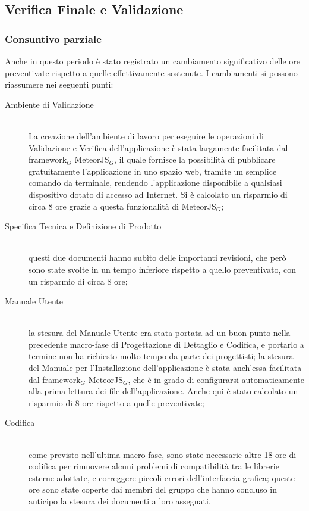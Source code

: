 \subsection{Verifica Finale e Validazione}

\subsubsection{Consuntivo parziale}
Anche in questo periodo è stato registrato un cambiamento significativo delle ore preventivate rispetto a quelle effettivamente sostenute. I cambiamenti si possono riassumere nei seguenti punti:
\begin{description}
\item[Ambiente di Validazione] \hfill \\
La creazione dell'ambiente di lavoro per eseguire le operazioni di Validazione e Verifica dell'applicazione è stata largamente facilitata dal framework$_G$ MeteorJS$_G$, il quale fornisce la possibilità di pubblicare gratuitamente l'applicazione in uno spazio web, tramite un semplice comando da terminale, rendendo l'applicazione disponibile a qualsiasi dispositivo dotato di accesso ad Internet. Si è calcolato un risparmio di circa 8 ore grazie a questa funzionalità di MeteorJS$_G$;
\item[Specifica Tecnica e Definizione di Prodotto] \hfill \\
questi due documenti hanno subìto delle importanti revisioni, che però sono state svolte in un tempo inferiore rispetto a quello preventivato, con un risparmio di circa 8 ore;
\item[Manuale Utente] \hfill \\
la stesura del Manuale Utente era stata portata ad un buon punto nella precedente macro-fase di Progettazione di Dettaglio e Codifica, e portarlo a termine non ha richiesto molto tempo da parte dei progettisti; la stesura del Manuale per l'Installazione dell'applicazione è stata anch'essa facilitata dal framework$_G$ MeteorJS$_G$, che è in grado di configurarsi automaticamente alla prima lettura dei file dell'applicazione. Anche qui è stato calcolato un risparmio di 8 ore rispetto a quelle preventivate; 
\item[Codifica] \hfill \\
come previsto nell'ultima macro-fase, sono state necessarie altre 18 ore di codifica per rimuovere alcuni problemi di compatibilità tra le librerie esterne adottate, e correggere piccoli errori dell'interfaccia grafica; queste ore sono state coperte dai membri del gruppo che hanno concluso in anticipo la stesura dei documenti a loro assegnati.
\end{description}

